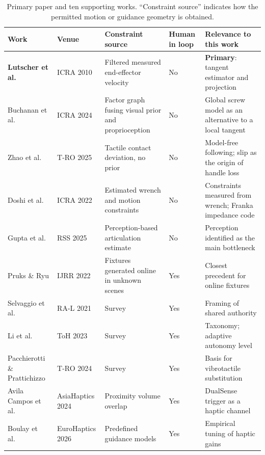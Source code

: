 \documentclass[11pt,letterpaper]{article}
\begin{document}
\begin{table}[t]
\centering
\caption{Primary paper and ten supporting works. ``Constraint source'' indicates how the permitted motion or guidance geometry is obtained.}
\label{tab:summary}
\footnotesize
\renewcommand{\arraystretch}{1.2}
\begin{tabularx}{\textwidth}{@{}>{\raggedright\arraybackslash}p{2.6cm}>{\raggedright\arraybackslash}p{1.95cm}>{\raggedright\arraybackslash}X>{\centering\arraybackslash}p{1.1cm}>{\raggedright\arraybackslash}X@{}}
\toprule
\textbf{Work} & \textbf{Venue} & \textbf{Constraint source} & \textbf{Human in loop} & \textbf{Relevance to this work} \\
\midrule
\textbf{Lutscher et al.\ \cite{lutscher2010control}} & ICRA 2010 & Filtered measured end-effector velocity & No & \textbf{Primary}: tangent estimator and projection \\
\midrule
Buchanan et al.\ \cite{buchanan2024online} & ICRA 2024 & Factor graph fusing visual prior and proprioception & No & Global screw model as an alternative to a local tangent \\
Zhao et al.\ \cite{zhao2025tacman} & T-RO 2025 & Tactile contact deviation, no prior & No & Model-free following; slip as the origin of handle loss \\
Doshi et al.\ \cite{doshi2022manipulation} & ICRA 2022 & Estimated wrench and motion constraints & No & Constraints measured from wrench; Franka impedance code \\
Gupta et al.\ \cite{gupta2025opening} & RSS 2025 & Perception-based articulation estimate & No & Perception identified as the main bottleneck \\
\midrule
Pruks \& Ryu \cite{pruks2022method} & IJRR 2022 & Fixtures generated online in unknown scenes & Yes & Closest precedent for online fixtures \\
Selvaggio et al.\ \cite{selvaggio2021autonomy} & RA-L 2021 & Survey & Yes & Framing of shared authority \\
Li et al.\ \cite{li2023classification} & ToH 2023 & Survey & Yes & Taxonomy; adaptive autonomy level \\
\midrule
Pacchierotti \& Prattichizzo \cite{pacchierotti2024cutaneous} & T-RO 2024 & Survey & Yes & Basis for vibrotactile substitution \\
Avila Campos et al.\ \cite{avilacampos2024conveying} & AsiaHaptics 2024 & Proximity volume overlap & Yes & DualSense trigger as a haptic channel \\
Boulay et al.\ \cite{boulay2026selecting} & EuroHaptics 2026 & Predefined guidance models & Yes & Empirical tuning of haptic gains \\
\bottomrule
\end{tabularx}
\end{table}
\end{document}
